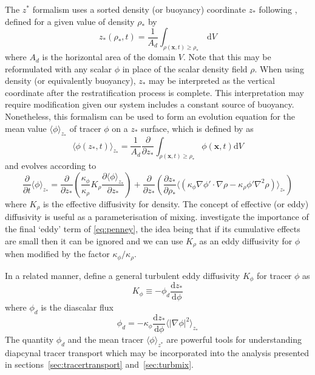\documentclass[a4paper]{article}
\begin{document}
The $z^*$ formalism uses a sorted density (or buoyancy) coordinate $z_*$ following \citet{winters1996},
defined for a given value of density $\rho_*$ by
\begin{equation}
	z_*(\rho_*, t) = \frac{1}{A_d}\int_{\rho(\bm{x},t) \ge \rho_*} \, \mathrm{d}V
\end{equation}
where $A_d$ is the horizontal area of the domain $V$. Note that this may be reformulated with any scalar $\phi$
in place of the scalar density field $\rho$. When using density (or equivalently buoyancy), $z_*$ may be
interpreted as the vertical coordinate after the restratification process is complete. This interpretation
may require modification given our system includes a constant source of buoyancy. Nonetheless, this formalism
can be used to form an evolution equation for the mean value $\langle \phi \rangle_{z_*}$ of tracer $\phi$ on
a $z_*$ surface, which is defined by \citet{penney2020} as
\begin{equation}
	\langle \phi(z_*, t) \rangle_{z_*} = \frac{1}{A_d} \frac{\partial}{\partial z_*} \int_{\rho(\bm{x}, t) \ge
		\rho_*} \phi(\bm{x}, t) \mathrm{d}V
\end{equation}
and evolves according to
\begin{equation}
	\frac{\partial}{\partial t} \langle \phi\rangle_{z_*} = \frac{\partial}{\partial z_*} \left(
	\frac{\kappa_\phi}{\kappa_\rho}K_\rho \frac{\partial \langle \phi \rangle_{z_*}}{\partial z_*} \right)
	+ \frac{\partial}{\partial z_*}\left(\frac{\partial z_*}{\partial \rho_*} \langle (\kappa_\phi \nabla
	\phi' \cdot \nabla \rho - \kappa_\rho \phi' \nabla^2 \rho)\rangle_{z_*}\right)
	\label{eq:penney}
\end{equation}
where $K_\rho$ is the effective diffusivity for density. The concept of effective (or eddy) diffusivity is
useful as a parameterisation of mixing. \citet{penney2020} investigate the importance of the final `eddy' term
of \eqref{eq:penney}, the idea being that if its cumulative effects are small then it can be ignored and we
can use $K_\rho$ as an eddy diffusivity for $\phi$ when modified by the factor $\kappa_\phi/\kappa_\rho$.

In a related manner, \citet{winters1996} define a general turbulent eddy diffusivity $K_\phi$ for tracer
$\phi$ as
\begin{equation}
	K_\phi \equiv -\phi_d \frac{\mathrm{d}z_*}{\mathrm{d}\phi}
	\label{eq:kphi}
\end{equation}
where $\phi_d$ is the diascalar flux
\begin{equation}
	\phi_d = -\kappa_\phi \frac{\mathrm{d}z_*}{\mathrm{d}\phi} \langle \left| \nabla \phi \right|^2
	\rangle_{z_*}
\end{equation}
The quantity $\phi_d$ and the mean tracer $\langle \phi \rangle_{z^*}$ are powerful tools for understanding
diapcynal tracer transport which may be incorporated into the analysis presented in
sections~\ref{sec:tracertransport} and~\ref{sec:turbmix}.
\end{document}
